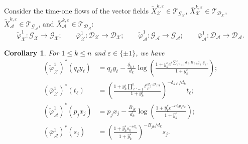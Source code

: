 \documentclass{amsart}
\newtheorem{corollary}[theorem]{Corollary}
\numberwithin{equation}{section}
\newcommand{\cA}{\mathcal{A}}
\newcommand{\cG}{\mathcal{G}}
\newcommand{\cD}{\mathcal{D}}
\newcommand{\cX}{\mathcal{X}}
\newcommand{\cT}{\mathcal{T}}
\begin{document}
Consider the time-one flows of the vector fields $\tilde X_\cX^{k,\varepsilon}\in\cT_{\cG_\cX}$, $\bar X_\cX^{k,\varepsilon}\in\cT_{\cD_\cX}$, $\tilde X_\cA^{k,\varepsilon}\in\cT_{\cG_\cA}$, and $\bar X_\cA^{k,\varepsilon}\in\cT_{\cD_\cA}$:
\[
  \tilde\varphi_\cX^1:\cG_\cX\to\cG_\cX;\qquad
  \bar\varphi_\cX^1:\cD_\cX\to\cD_\cX;\qquad
  \tilde\varphi_\cA^1:\cG_\cA\to\cG_\cA;\qquad
  \bar\varphi_\cA^1:\cD_\cA\to\cD_\cA.
\]
\begin{corollary}
  For $1\le k\le n$ and $\varepsilon\in\{\pm1\}$, we have
  \begin{align*}
    (\tilde\varphi_\cX^1)^*(q_\ell y_\ell)&=q_\ell y_\ell-\frac{\delta_{k\ell}}{d_k}\log\left(\frac{1+y_k^\varepsilon e^{\varepsilon\sum_{\ell'=1}^n d_{\ell'} B_{\ell' k}q_{\ell'} y_{\ell'}}}{1+y_k^\varepsilon}\right);\\
    (\bar\varphi_\cX^1)^*(t_\ell)&=\left(\frac{1+y_k^\varepsilon \prod_{\ell'=1}^n t_{\ell'}^{\varepsilon d_{\ell'} B_{\ell' k}}}{1+y_k^\varepsilon}\right)^{-\delta_{k\ell}/d_k}t_\ell;\\
    (\tilde\varphi_\cA^1)^*(p_jx_j)&=p_jx_j-\frac{B_{jk}}{d_k}\log\left(\frac{1+\hat y_k^\varepsilon e^{-\varepsilon d_kp_kx_k}}{1+\hat y_k^\varepsilon}\right);\\
    (\bar\varphi_\cA^1)^*(s_j)&=\left(\frac{1+\hat y_k^\varepsilon s_k^{-\varepsilon d_k}}{1+\hat y_k^\varepsilon}\right)^{-B_{jk}/d_k}s_j.\\
  \end{align*}
\end{corollary}
\end{document}
